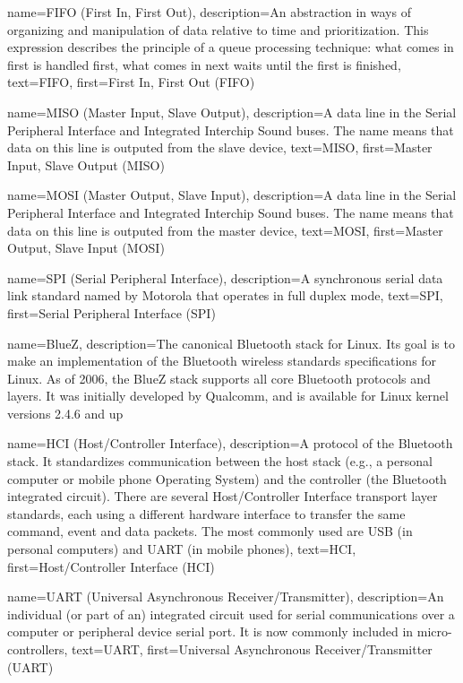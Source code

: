 {
  name={FIFO (First In, First Out)},
  description={An abstraction in ways of organizing and manipulation
    of data relative to time and prioritization. This expression
    describes the principle of a queue processing technique: what
    comes in first is handled first, what comes in next waits until
    the first is finished},
  text=FIFO,
  first={First In, First Out (FIFO)}
}

{
  name={MISO (Master Input, Slave Output)},
  description={A data line in the Serial Peripheral Interface and
    Integrated Interchip Sound buses. The name means that data on this
    line is outputed from the slave device},
  text=MISO,
  first={Master Input, Slave Output (MISO)}
}

{
  name={MOSI (Master Output, Slave Input)},
  description={A data line in the Serial Peripheral Interface and
    Integrated Interchip Sound buses. The name means that data on this
    line is outputed from the master device},
  text=MOSI,
  first={Master Output, Slave Input (MOSI)}
}

{
  name=SPI (Serial Peripheral Interface),
  description={A synchronous serial data link standard named by
    Motorola that operates in full duplex mode},
  text=SPI,
  first=Serial Peripheral Interface (SPI)
}

{
  name=BlueZ,
  description={The canonical Bluetooth stack for Linux. Its goal is to
    make an implementation of the Bluetooth wireless standards
    specifications for Linux. As of 2006, the BlueZ stack supports all
    core Bluetooth protocols and layers. It was initially developed by
    Qualcomm, and is available for Linux kernel versions 2.4.6 and up}
}

{
  name=HCI (Host/Controller Interface),
  description={A protocol of the Bluetooth stack. It standardizes
    communication between the host stack (e.g., a personal computer or
    mobile phone Operating System) and the controller (the Bluetooth
    integrated circuit). There are several Host/Controller Interface
    transport layer standards, each using a different hardware
    interface to transfer the same command, event and data
    packets. The most commonly used are USB (in personal computers)
    and UART (in mobile phones)},
  text=HCI,
  first=Host/Controller Interface (HCI)
}

{
  name=UART (Universal Asynchronous Receiver/Transmitter),
  description={An individual (or part of an) integrated circuit used
    for serial communications over a computer or peripheral device
    serial port. It is now commonly included in micro-controllers},
  text=UART,
  first=Universal Asynchronous Receiver/Transmitter (UART)
}

